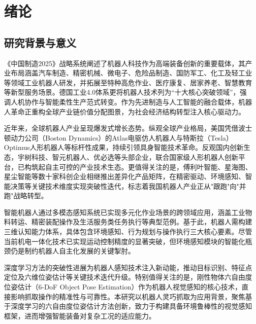 \chapter{绪论}

\section{研究背景与意义}
《中国制造2025》\cite{中国制造2025}战略系统阐述了机器人科技作为高端装备创新的重要载体，其产业布局涵盖汽车制造、精密机械、微电子、危险品制造、国防军工、化工及轻工业等领域工业机器人研发，并拓展至特种高危作业、医疗康复、居家养老、智慧教育等新型服务场景。德国工业4.0\cite{德国工业4.0}体系更将机器人技术列为“十大核心突破领域”，强调人机协作与智能柔性生产范式转变。作为先进制造与人工智能的融合载体，机器人革命正重构全球产业链价值分配图景，为社会经济结构转型注入核心驱动力。

近年来，全球机器人产业呈现爆发式增长态势\cite{2022中国智能机器人行业研究报告}。纵观全球产业格局，美国凭借波士顿动力公司（Boston Dynamics）的Atlas电驱仿人机器人\cite{bostondynamics}与特斯拉（Tesla）Optimus人形机器人\cite{optimus_wikipedia}等标杆性成果，持续引领具身智能技术革命。反观国内创新生态，宇树科技、智元机器人、优必选等头部企业，联合国家级人形机器人创新平台，已构筑起自主可控的产业技术生态。更值得关注的是，傅利叶智能、星海图、星尘智能等数十家科创企业相继推出差异化产品矩阵，在精密驱动、环境感知、智能决策等关键技术维度实现突破性迭代，标志着我国机器人产业正从"跟跑"向"并跑"战略转型。

智能机器人通过多模态感知系统已实现多元化作业场景的跨领域应用，涵盖工业物料转运\cite{bostondynamics_box}、精密装配操作\cite{stoegerautomation_spatz}及生活服务类任务执行\cite{xtech_robot}等典型范例。基于此，机器人需构建三维认知能力体系，具体包含环境感知、行为规划与操作执行三大核心要素\cite{蔡自兴2000机器人学}。尽管当前机电一体化技术已实现运动控制精度的显著突破\cite{doi:10.1177/02783649241285161}，但环境感知模块的智能化瓶颈仍是制约机器人自主化发展的关键掣肘\cite{doi:10.1126/scirobotics.adw1608}。

深度学习方法\cite{lecun2015deep}的突破性进展为机器人感知技术注入新动能，推动目标识别\cite{objectDetectionSurvey}、特征点定位\cite{keypointSurvey}及六维位姿估计\cite{poseEstimationSurvey}等关键技术迭代升级。特别值得关注的是，刚性物体六自由度位姿估计（6-DoF Object Pose Estimation）作为机器人视觉感知的核心技术，直接影响抓取操作的精准性与可靠性。本研究以机器人灵巧抓取为应用背景，聚焦基于深度学习的六自由度位姿估计方法创新，致力于构建具备环境鲁棒性的视觉感知框架，进而增强智能装备对复杂工况的适应能力。

